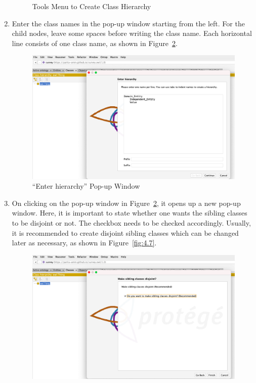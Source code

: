 \begin{doublespace}
\begin{enumerate}
\begin{figure}[htp]
    \caption{Tools Menu to Create Class Hierarchy}
    \label{fig:4.5}
\end{figure}
    \item Enter the class names in the pop-up window starting from the left. For the child nodes, leave some spaces before writing the class name. Each horizontal line consists of one class name, as shown in Figure~\ref{fig:4.6}. 
    \begin{figure}[htp]
    \centering
    \includegraphics[width=15cm]{images/ch4/Figure6.png}
    \caption{\enquote{Enter hierarchy} Pop-up Window}
    \label{fig:4.6}
\end{figure}
    \item On clicking  on the pop-up window in Figure~\ref{fig:4.6}, it opens up a new pop-up window. Here, it is important to state whether one wants the sibling classes to be disjoint or not. The checkbox needs to be checked accordingly. Usually, it is recommended to create disjoint sibling classes which can be changed later as necessary, as shown in Figure~\ref{fig:4.7}.
    \begin{figure}[htp]
    \centering
    \includegraphics[width=15cm]{images/ch4/Figure7.png}

\end{figure}
\end{enumerate}
\end{doublespace}

